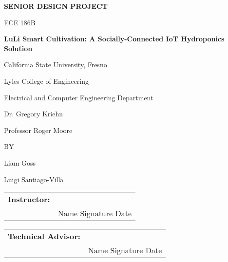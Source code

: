 \documentclass[12pt]{article} %
\begin{document}
\begin{titlepage}
    \centering
    {\Large\bfseries SENIOR DESIGN PROJECT\par}
    \vspace{1.5cm}
    {\Large ECE 186B\par}
    \vspace{1.5cm}
    {\Large\bfseries LuLi Smart Cultivation: A Socially-Connected IoT Hydroponics Solution\par}
    \vspace{2cm}
    {\large California State University, Fresno\par}
    {\large Lyles College of Engineering\par}
    {\large Electrical and Computer Engineering Department\par}
    \vspace{2cm}
    {\large Dr. Gregory Kriehn\par}
    {\large Professor Roger Moore\par}
    \vspace{2cm}
    {\large BY\par}
    \vspace{1cm}
    {\large Liam Goss\par}
    {\large Luigi Santiago-Villa\par}
    \vspace{2cm} %
    \begin{tabular}{p{} p{}}
        \textbf{Instructor:} & \hrulefill \\
        & \small Name \hfill Signature \hfill Date \\
    \end{tabular}
    \newline
    \vspace{1cm} %
    \begin{tabular}{p{} p{}}
        \textbf{Technical Advisor:} & \hrulefill \\
        & \small Name \hfill Signature \hfill Date \\
    \end{tabular}
\end{titlepage}
\pagebreak
\tableofcontents
\pagebreak

\listoftables
\pagebreak
\end{document}
